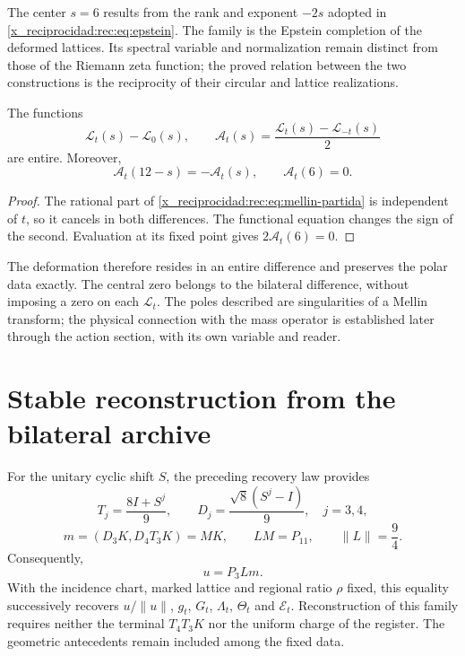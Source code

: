The center \(s=6\) results from the rank and exponent \(-2s\) adopted in \eqref{x_reciprocidad:rec:eq:epstein}. The family is the Epstein completion of the deformed lattices. Its spectral variable and normalization remain distinct from those of the Riemann zeta function; the proved relation between the two constructions is the reciprocity of their circular and lattice realizations.

\begin{corollary}
\label{x_reciprocidad:rec:cor:polar}
The functions
\[
 \mathcal L_t(s)-\mathcal L_0(s),\qquad
 \mathcal A_t(s)=\frac{\mathcal L_t(s)-\mathcal L_{-t}(s)}2
\]
are entire. Moreover,
\[
 \mathcal A_t(12-s)=-\mathcal A_t(s),\qquad \mathcal A_t(6)=0.
\]
\end{corollary}
\begin{proof}
The rational part of \eqref{x_reciprocidad:rec:eq:mellin-partida} is independent of \(t\), so it cancels in both differences. The functional equation changes the sign of the second. Evaluation at its fixed point gives \(2\mathcal A_t(6)=0\).
\end{proof}

The deformation therefore resides in an entire difference and preserves the polar data exactly. The central zero belongs to the bilateral difference, without imposing a zero on each \(\mathcal L_t\). The poles described are singularities of a Mellin transform; the physical connection with the mass operator is established later through the action section, with its own variable and reader.

\section{Stable reconstruction from the bilateral archive}
\label{x_reciprocidad:rec:archivo}

For the unitary cyclic shift \(S\), the preceding recovery law provides
\[
 T_j=\frac{8I+S^j}{9},\qquad D_j=\frac{\sqrt8(S^j-I)}9,
 \quad j=3,4,
\]
\begin{equation}
 m=(D_3K,D_4T_3K)=MK,\qquad LM=P_{11},\qquad\|L\|=\frac94.
 \label{x_reciprocidad:rec:eq:archivo}
\end{equation}
Consequently,
\begin{equation}
 u=P_3Lm.
 \label{x_reciprocidad:rec:eq:recuperacion-u}
\end{equation}
With the incidence chart, marked lattice and regional ratio \(\rho\) fixed, this equality successively recovers \(u/\|u\|\), \(g_t\), \(G_t\), \(\Lambda_t\), \(\Theta_t\) and \(\mathcal E_t\). Reconstruction of this family requires neither the terminal \(T_4T_3K\) nor the uniform charge of the register. The geometric antecedents remain included among the fixed data.


